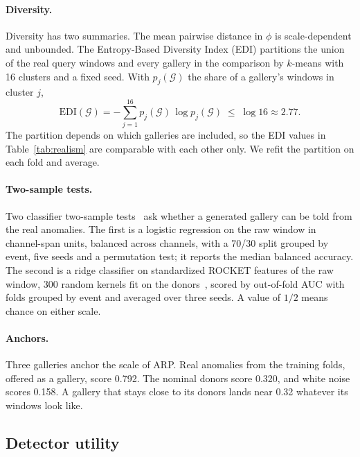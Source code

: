 \documentclass[11pt,a4paper]{article}
\newcommand{\phivec}{\phi}                 %
\newcommand{\setG}{\mathcal{G}}            %
\begin{document}
\paragraph{Diversity.}
Diversity has two summaries. The mean pairwise distance in $\phivec$ is
scale-dependent and unbounded. The Entropy-Based Diversity Index (EDI)
partitions the union of the real query windows and every gallery in the
comparison by $k$-means with 16 clusters and a fixed seed. With
$p_{j}(\setG)$ the share of a gallery's windows in cluster $j$,
\begin{equation}
\label{eq:edi}
\mathrm{EDI}(\setG)
  = -\sum_{j=1}^{16} p_{j}(\setG)\,\log p_{j}(\setG)
  \;\le\; \log 16 \approx 2.77 .
\end{equation}
The partition depends on which galleries are included, so the EDI values in
Table~\ref{tab:realism} are comparable with each other only. We refit the
partition on each fold and average.

\paragraph{Two-sample tests.}
Two classifier two-sample tests~\cite{lopezpaz2017c2st} ask whether a
generated gallery can be told from the real anomalies. The first is a logistic
regression on the raw window in channel-span units, balanced across channels,
with a 70/30 split grouped by event, five seeds and a permutation test; it
reports the median balanced accuracy. The second is a ridge classifier on
standardized ROCKET features of the raw window, 300 random kernels fit on the
donors~\cite{dempster2020rocket}, scored by out-of-fold AUC with folds grouped
by event and averaged over three seeds. A value of $1/2$ means chance on
either scale.

\paragraph{Anchors.}
Three galleries anchor the scale of ARP. Real anomalies from the training
folds, offered as a gallery, score 0.792. The nominal donors score 0.320, and
white noise scores 0.158. A gallery that stays close to its donors lands near
0.32 whatever its windows look like.

\subsection{Detector utility}
\label{sec:detector}
\end{document}
